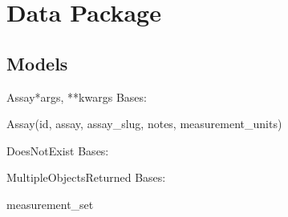 \documentclass[letterpaper,10pt,english]{sphinxmanual}
\begin{document}
\section{Data Package}
\hypertarget{module-data}{}
\modulesynopsis{}

\subsection{Models}
\hypertarget{module-data.models}{}
\modulesynopsis{}

\hypertarget{data.models.Assay}{}\begin{classdesc}{Assay}{*args, **kwargs}
Bases: 

Assay(id, assay, assay\_slug, notes, measurement\_units)

\hypertarget{data.models.Assay.DoesNotExist}{}\begin{excdesc}{DoesNotExist}
Bases: 
\end{excdesc}

\hypertarget{data.models.Assay.MultipleObjectsReturned}{}\begin{excdesc}{MultipleObjectsReturned}
Bases: 
\end{excdesc}

\hypertarget{data.models.Assay.measurement_set}{}\begin{memberdesc}[Assay]{measurement\_set}\end{memberdesc}
\end{classdesc}
\end{document}

